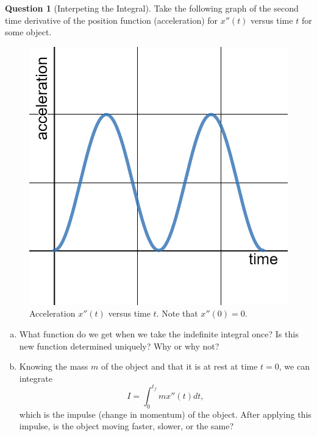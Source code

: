 \documentclass[12pt]{article}
\theoremstyle{definition}
\newtheorem{question}{Question}
\begin{document}
\begin{question}[Interpeting the Integral]
Take the following graph of the second time derivative of the position function (acceleration) for $x''(t)$ versus time $t$ for some object.\\

\begin{figure}[h]
    \centering
    \includegraphics[scale=.2]{acceleration.png}
    \caption{Acceleration $x''(t)$ versus time $t$. Note that $x''(0)=0.$}
    \label{fig:my_label}
\end{figure}
\begin{enumerate}[(a)]
    \item What function do we get when we take the indefinite integral once? Is this new function determined uniquely? Why or why not?
    \item Knowing the mass $m$ of the object and that it is at rest at time $t=0$, we can integrate
    \[
    I=\int_0^{t_f} mx''(t)dt,
    \]
    which is the impulse (change in momentum) of the object. After applying this impulse, is the object moving faster, slower, or the same?
\end{enumerate}
\end{question}
\end{document}
